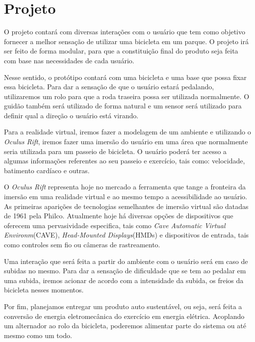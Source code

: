 \chapter[Projeto]{Projeto}
O projeto contará com diversas interações com o usuário que tem como objetivo fornecer a melhor sensação de utilizar uma bicicleta em um parque. O projeto irá ser feito de forma modular, para que a constituição final do produto seja feita com base nas necessidades de cada usuário. 

Nesse sentido, o protótipo contará com uma bicicleta e uma base que possa fixar essa bicicleta. Para dar a sensação de que o usuário estará pedalando, utilizaremos um rolo para que a roda traseira possa ser utilizada normalmente. O guidão também será utilizado de forma natural e um sensor será utilizado para definir qual a direção o usuário está virando. 

Para a realidade virtual, iremos fazer a modelagem de um ambiente e utilizando o \textit{Oculus Rift}, iremos fazer uma imersão do usuário em uma área que normalmente seria utilizada para um passeio de bicicleta. O usuário poderá ter acesso a algumas informações referentes ao seu passeio e exercício, tais como: velocidade, batimento cardíaco e outras. 

O \textit{Oculus Rift} representa hoje no mercado a ferramenta que tange a fronteira da imersão em uma realidade virtual e ao mesmo tempo a acessibilidade ao usuário. As primeiras aparições de tecnologias semelhantes de imersão virtual são datadas de 1961 pela Philco\cite{boasoverview}. Atualmente hoje há diversas opções de dispositivos que oferecem uma pervasividade especifica, tais como \textit{Cave Automatic Virtual Environm}(CAVE), \textit{Head-Mounted Displays}(HMDs) e dispositivos de entrada, tais como controles sem fio ou câmeras de rastreamento.

Uma interação que será feita a partir do ambiente com o usuário será em caso de subidas no mesmo. Para dar a sensação de dificuldade que se tem ao pedalar em uma subida, iremos acionar de acordo com a intensidade da subida, os freios da bicicleta nesses momentos. 

Por fim, planejamos entregar um produto auto sustentável, ou seja, será feita a conversão de energia eletromecânica do exercício em energia elétrica. Acoplando um alternador ao rolo da bicicleta, poderemos alimentar parte do sistema ou até mesmo como um todo.

